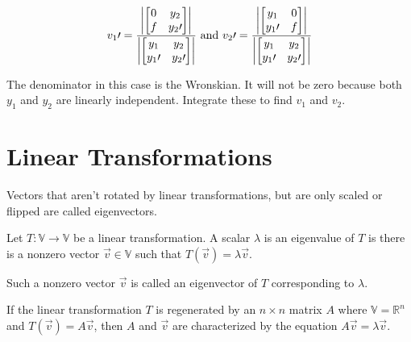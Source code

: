         \[
            v_1\prime = \frac{\left\lvert \left[ \begin{matrix}
                0 & y_2\\
                f & y_2\prime\\
            \end{matrix} \right] \right\rvert }{\left\lvert \left[ \begin{matrix}
                y_1 & y_2\\
                y_1\prime & y_2\prime\\
            \end{matrix} \right] \right\rvert }
            \text{ and }
            v_2\prime = \frac{\left\lvert \left[ \begin{matrix}
                y_1 & 0\\
                y_1\prime & f\\
            \end{matrix} \right] \right\rvert }{\left\lvert \left[ \begin{matrix}
                y_1 & y_2\\
                y_1\prime & y_2\prime\\
            \end{matrix} \right] \right\rvert }
        \]

    The denominator in this case is the Wronskian. It will not be zero because both $y_1$ and $y_2$ are linearly independent. Integrate these to find $v_1$ and $v_2$.

\section{Linear Transformations}
Vectors that aren't rotated by linear transformations, but are only scaled or flipped are called eigenvectors.

\begin{thm}
    Let $T: \mathbb{V} \to \mathbb{V}$ be a linear transformation. A scalar $\lambda$ is an eigenvalue of $T$ is there is a nonzero vector $\vec{v} \in \mathbb{V}$ such that $T(\vec{v}) = \lambda \vec{v}$.

    Such a nonzero vector $\vec{v}$ is called an eigenvector of $T$ corresponding to $\lambda$.

    If the linear transformation $T$ is regenerated by an $n\times n$ matrix $A$ where $\mathbb{V} = \mathbb{R}^n$ and $T(\vec{v}) = A \vec{v}$, then $A$ and $\vec{v}$ are characterized by the equation $A \vec{v} = \lambda \vec{v}$.
\end{thm}

